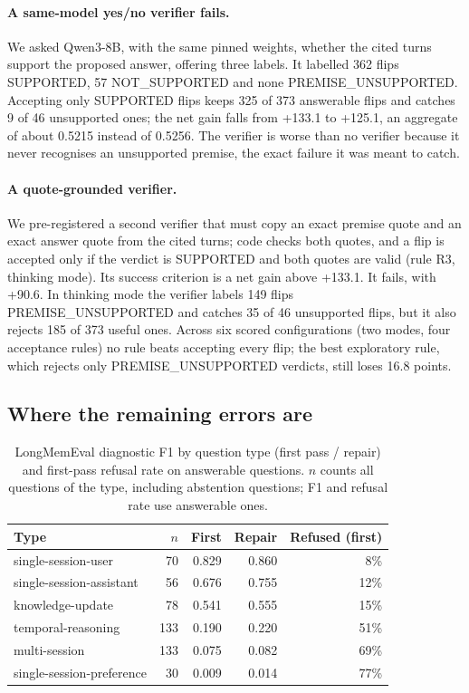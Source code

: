 \documentclass[11pt]{article}
\begin{document}
\paragraph{A same-model yes/no verifier fails.}
We asked Qwen3-8B, with the same pinned weights, whether the cited turns support
the proposed answer, offering three labels. It labelled 362 flips SUPPORTED, 57
NOT\_SUPPORTED and none PREMISE\_UNSUPPORTED. Accepting only SUPPORTED flips
keeps 325 of 373 answerable flips and catches 9 of 46 unsupported ones; the net
gain falls from +133.1 to +125.1, an aggregate of about 0.5215 instead of 0.5256.
The verifier is worse than no verifier because it never recognises an
unsupported premise, the exact failure it was meant to catch.

\paragraph{A quote-grounded verifier.}
We pre-registered a second verifier that must copy an exact premise quote and
an exact answer quote from the cited turns; code checks both quotes, and a flip
is accepted only if the verdict is SUPPORTED and both quotes are valid
(rule R3, thinking mode). Its success criterion is a net gain above +133.1.
It fails, with +90.6. In thinking mode the verifier labels 149 flips
PREMISE\_UNSUPPORTED and catches 35 of 46 unsupported flips, but it also rejects
185 of 373 useful ones. Across six scored configurations (two modes, four
acceptance rules) no rule beats accepting every flip; the best exploratory rule,
which rejects only PREMISE\_UNSUPPORTED verdicts, still loses 16.8 points.

\subsection{Where the remaining errors are}
\label{sec:errors}

\begin{table}[t]
\centering
\caption{LongMemEval diagnostic F1 by question type (first pass / repair) and
first-pass refusal rate on answerable questions. $n$ counts all questions of the
type, including abstention questions; F1 and refusal rate use answerable ones.}
\label{tab:lme-type}
\small
\begin{tabular}{lrrrr}
\toprule
Type & $n$ & First & Repair & Refused (first) \\
\midrule
single-session-user & 70 & 0.829 & 0.860 & 8\% \\
single-session-assistant & 56 & 0.676 & 0.755 & 12\% \\
knowledge-update & 78 & 0.541 & 0.555 & 15\% \\
temporal-reasoning & 133 & 0.190 & 0.220 & 51\% \\
multi-session & 133 & 0.075 & 0.082 & 69\% \\
single-session-preference & 30 & 0.009 & 0.014 & 77\% \\
\bottomrule
\end{tabular}
\end{table}
\end{document}
